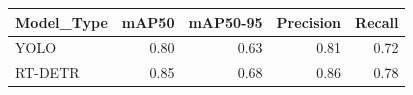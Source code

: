 \begin{tabular}{lrrrr}
\toprule
Model_Type & mAP50 & mAP50-95 & Precision & Recall \\
\midrule
YOLO & 0.80 & 0.63 & 0.81 & 0.72 \\
RT-DETR & 0.85 & 0.68 & 0.86 & 0.78 \\
\bottomrule
\end{tabular}
